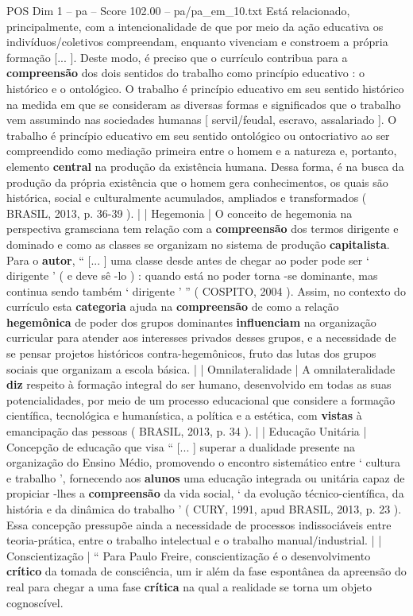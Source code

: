\begin{textsample}{POS Dim 1 – pa – Score 102.00 – pa/pa\_em\_10.txt}
Está relacionado, principalmente, com a intencionalidade de que por meio da ação educativa os indivíduos/coletivos compreendam, enquanto vivenciam e constroem a própria formação [... ].
Deste modo, é preciso que o currículo contribua para a \textbf{compreensão} dos dois sentidos do trabalho como princípio educativo : o histórico e o ontológico.
O trabalho é princípio educativo em seu sentido histórico na medida em que se consideram as diversas formas e significados que o trabalho vem assumindo nas sociedades humanas [ servil/feudal, escravo, assalariado ].
O trabalho é princípio educativo em seu sentido ontológico ou ontocriativo ao ser compreendido como mediação primeira entre o homem e a natureza e, portanto, elemento \textbf{central} na produção da existência humana.
Dessa forma, é na busca da produção da própria existência que o homem gera conhecimentos, os quais são histórica, social e culturalmente acumulados, ampliados e transformados ( BRASIL, 2013, p. 36-39 ). | | Hegemonia | O conceito de hegemonia na perspectiva gramsciana tem relação com a \textbf{compreensão} dos termos dirigente e dominado e como as classes se organizam no sistema de produção \textbf{capitalista}.
Para o \textbf{autor}, “ [... ] uma classe desde antes de chegar ao poder pode ser ‘ dirigente ’ ( e deve sê -lo ) : quando está no poder torna -se dominante, mas continua sendo também ‘ dirigente ’ ” ( COSPITO, 2004 ).
Assim, no contexto do currículo esta \textbf{categoria} ajuda na \textbf{compreensão} de como a relação \textbf{hegemônica} de poder dos grupos dominantes \textbf{influenciam} na organização curricular para atender aos interesses privados desses grupos, e a necessidade de se pensar projetos históricos contra-hegemônicos, fruto das lutas dos grupos sociais que organizam a escola básica. | | Omnilateralidade | A omnilateralidade \textbf{diz} respeito à formação integral do ser humano, desenvolvido em todas as suas potencialidades, por meio de um processo educacional que considere a formação científica, tecnológica e humanística, a política e a estética, com \textbf{vistas} à emancipação das pessoas ( BRASIL, 2013, p. 34 ). | | Educação Unitária | Concepção de educação que visa “ [... ] superar a dualidade presente na organização do Ensino Médio, promovendo o encontro sistemático entre ‘ cultura e trabalho ’, fornecendo aos \textbf{alunos} uma educação integrada ou unitária capaz de propiciar -lhes a \textbf{compreensão} da vida social, ‘ da evolução técnico-científica, da história e da dinâmica do trabalho ’ ( CURY, 1991, apud BRASIL, 2013, p. 23 ).
Essa concepção pressupõe ainda a necessidade de processos indissociáveis entre teoria-prática, entre o trabalho intelectual e o trabalho manual/industrial. | | Conscientização | “ Para Paulo Freire, conscientização é o desenvolvimento \textbf{crítico} da tomada de consciência, um ir além da fase espontânea da apreensão do real para chegar a uma fase \textbf{crítica} na qual a realidade se torna um objeto cognoscível.

\end{textsample}
